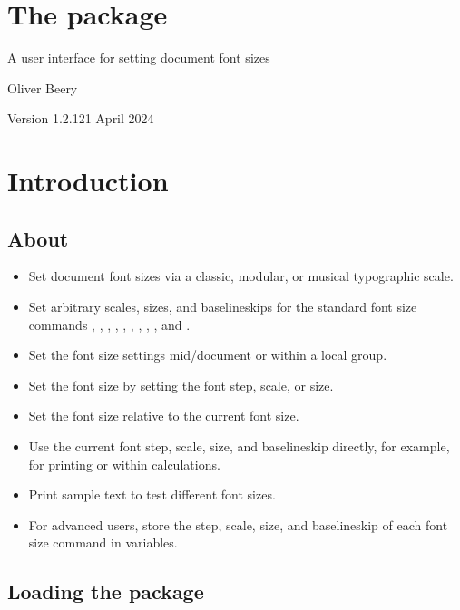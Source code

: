 \documentclass{beery}
\begin{document}
\section*
  {%
    The  package%
  }

A user interface for setting document font sizes

Oliver Beery

Version 1.2.1\quad{}21 April 2024


\section{Introduction}
\label{sec:intro}

\subsection{About}
\label{subsec:about}

\begin{itemize}
  \item
  Set document font sizes via a classic, modular, or musical typographic scale.
  \item
  Set arbitrary scales, sizes, and baselineskips for the standard font size commands , , , , , , , , , and .
  \item
  Set the font size settings mid\-/document or within a local group.
  \item
  Set the font size by setting the font step, scale, or size.
  \item
  Set the font size relative to the current font size.
  \item
  Use the current font step, scale, size, and baselineskip directly, for example, for printing or within calculations.
  \item
  Print sample text to test different font sizes.
  \item
  For advanced users, store the step, scale, size, and baselineskip of each font size command in  variables.
\end{itemize}

\subsection{Loading the package}
\label{subsec:loading}
\end{document}
